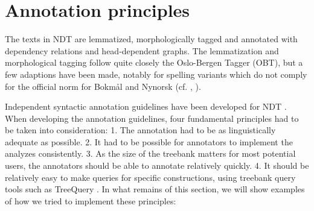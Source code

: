 \documentclass[11pt,a4paper]{article}
\begin{document}

\section{Annotation principles}

The texts in NDT are lemmatized, morphologically tagged and annotated with dependency relations and head-dependent graphs. The lemmatization and morphological tagging follow quite closely the Oslo-Bergen Tagger (OBT), but a few adaptions have been made, notably for spelling variants which do not comply for the official norm for Bokmål and Nynorsk (cf. \cite{Joh:Hag:No:Lyn:2011}, \cite{Sol:2013}).


Independent syntactic annotation guidelines have been developed for NDT \cite{Kin:Sol:Eri:2013}. When developing the annotation guidelines, four fundamental principles had to be taken into consideration: 1. The annotation had to be as linguistically adequate as possible.
2. It had to be possible for annotators to implement the analyzes consistently. 3. As the size of the treebank matters for most potential users, the annotators should be able to annotate relatively quickly.
4. It should be relatively easy to make queries for specific constructions, using treebank query tools such as TreeQuery \cite{Paj:Ste:09}. In what remains of this section, we will show examples of how we tried to implement these principles:
\end{document}
